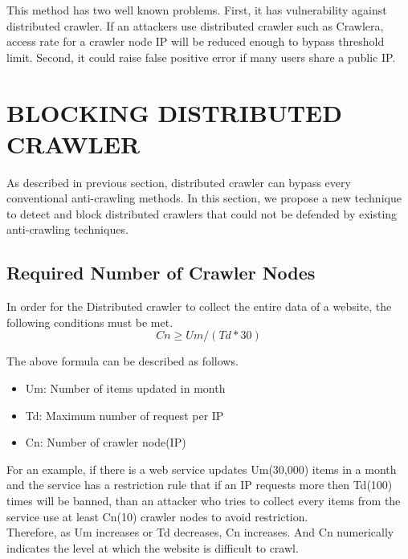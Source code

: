 \documentclass[sigconf,anonymous=false]{acmart}
\begin{document}
\begin{enumerate}
This method has two well known problems. 
First, it has vulnerability against distributed crawler. If an attackers use distributed crawler such as Crawlera, access rate for a crawler node IP will be reduced enough to bypass threshold limit.
Second, it could raise false positive error if many users share a public IP.
\newline


\end{enumerate}


%
%
\section{BLOCKING DISTRIBUTED CRAWLER}
As described in previous section, distributed crawler can bypass every conventional anti-crawling methods. In this section, we propose a new technique to detect and block distributed crawlers that could not be defended by existing anti-crawling techniques.

\subsection{Required Number of Crawler Nodes}
In order for the Distributed crawler to collect the entire data of a website, the following conditions must be met.\\
\begin{displaymath}
Cn \geq Um / (Td * 30) 
\end{displaymath}

The above formula can be described as follows.

\begin{itemize}
\item Um: Number of items updated in month
\item Td: Maximum number of request per IP
\item Cn: Number of crawler node(IP)
\end{itemize}

For an example, if there is a web service updates Um(30,000) items in a month and the service has a restriction rule that if an IP requests more then Td(100) times will be banned, than an attacker who tries to collect every items from the service use at least Cn(10) crawler nodes to avoid restriction.\\
Therefore, as Um increases or Td decreases, Cn increases. And Cn numerically indicates the level at which the website is difficult to crawl.
\end{document}
